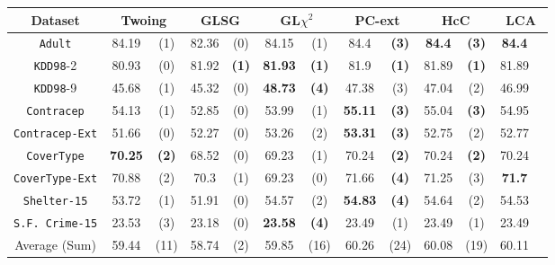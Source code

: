 \begin{table}
\small
\centering
\begin{tabular}{c|cc|cc|cc|cc|cc|cc} 
Dataset            &\multicolumn{2}{c|}{Twoing} & \multicolumn{2}{c|}{GLSG} & \multicolumn{2}{c|}{GL$\chi^2$} & \multicolumn{2}{c|}{PC-ext}& \multicolumn{2}{c|}{HcC} & \multicolumn{2}{c}{LCA} \\
\hline   
{\tt Adult}        & 84.19          & (1)       & 82.36      & (0)          &  84.15      &  (1)              & 84.4        & {\bf (3)}    & {\bf 84.4 } & {\bf (3)} & {\bf 84.4 } &           \\
{\tt KDD98}-2      & 80.93          & (0)       & 81.92      & {\bf (1)}    & {\bf 81.93} &  {\bf (1)}        & 81.9        & {\bf (1)}    & 81.89       & {\bf (1)} & 81.89       &           \\ 
{\tt KDD98}-9      & 45.68          & (1)       & 45.32      & (0)          & {\bf 48.73} & {\bf (4)}         &  47.38      & (3)          & 47.04       & (2)       & 46.99       &           \\ 
{\tt Contracep}    & 54.13          & (1)       & 52.85      & (0)          & 53.99       & (1)               & {\bf 55.11} & {\bf (3)}    & 55.04       & {\bf (3)} & 54.95       &           \\  
{\tt Contracep-Ext}& 51.66          & (0)       & 52.27      & (0)          & 53.26       & (2)               & {\bf 53.31} & {\bf (3)}    & 52.75       & (2)       & 52.77       &           \\ 
{\tt CoverType}    & {\bf 70.25}    & {\bf (2)} & 68.52      & (0)          & 69.23       & (1)               &  70.24      & {\bf (2)}    & 70.24       & {\bf (2)} & 70.24       &           \\  
{\tt CoverType-Ext}& 70.88          & (2)       & 70.3       & (1)          & 69.23       & (0)               & 71.66       & {\bf (4)}    & 71.25       & (3)       & {\bf 71.7 } &           \\ 
{\tt Shelter-15}   & 53.72          & (1)       & 51.91      & (0)          & 54.57       & (2)               & {\bf 54.83} & {\bf (4)}    & 54.64       & (2)       & 54.53       &           \\   
{\tt S.F. Crime-15}& 23.53          & (3)       & 23.18      & (0)          & {\bf 23.58} & {\bf (4)}         & 23.49       & (1)          & 23.49       & (1)       & 23.49       &           \\ 
\hline
Average (Sum)      & 59.44          & (11)      & 58.74      & (2)          & 59.85       & (16)              & 60.26       & (24)         & 60.08       & (19)      & 60.11       &


\end{tabular}
\end{table}
